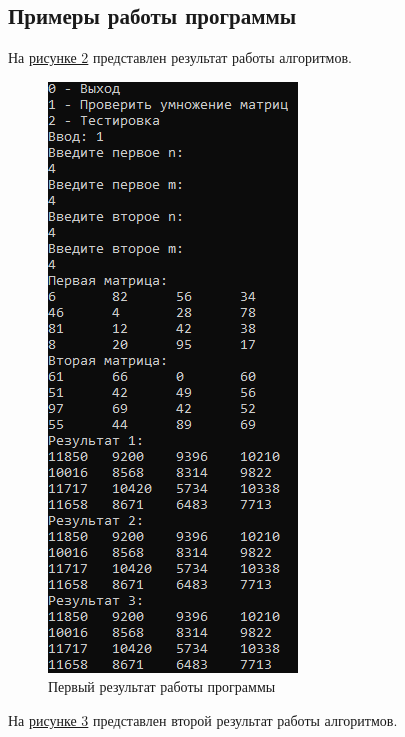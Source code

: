 \documentclass[14pt, a4paper]{extarticle}
\begin{document}
\subsection{Примеры работы программы}
На \hyperref[Example1]{рисунке 2} представлен результат работы алгоритмов.
\begin{figure}[h!]
	\centering
	\includegraphics[scale=1]{source/Example1.png}
	\caption{Первый результат работы программы}
	\label{Example1}
\end{figure}\par
\clearpage
На \hyperref[Example2]{рисунке 3} представлен второй результат работы алгоритмов.
\end{document}
